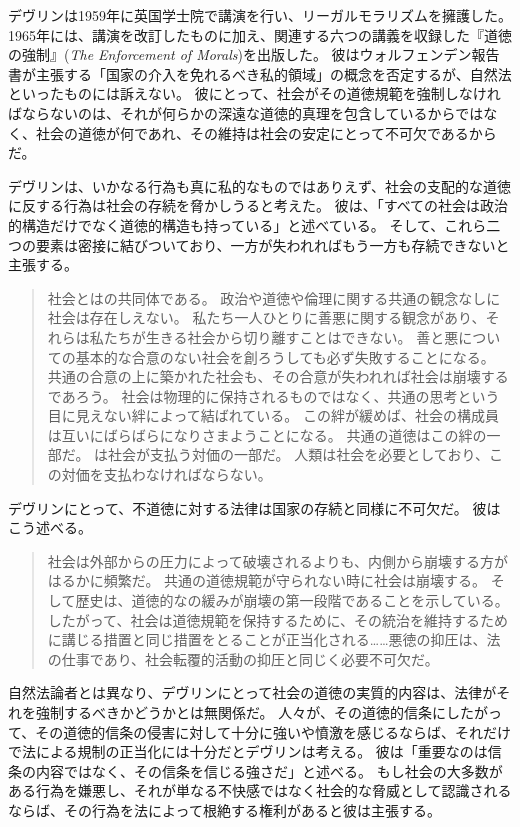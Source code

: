 \documentclass[paper=a4,book,openany]{jlreq} \usepackage{mystyle}
\begin{document}
デヴリンは1959年に英国学士院で講演を行い、リーガルモラリズムを擁護した。
1965年には、講演を改訂したものに加え、関連する六つの講義を収録した『道徳の強制』(\emph{The Enforcement of Morals})を出版した。
彼はウォルフェンデン報告書が主張する「国家の介入を免れるべき私的領域」の概念を否定するが、自然法といったものには訴えない。
彼にとって、社会がその道徳規範を強制しなければならないのは、それが何らかの深遠な道徳的真理を包含しているからではなく、社会の道徳が何であれ、その維持は社会の安定にとって不可欠であるからだ。

デヴリンは、いかなる行為も真に私的なものではありえず、社会の支配的な道徳に反する行為は社会の存続を脅かしうると考えた。
彼は、「すべての社会は政治的構造だけでなく道徳的構造も持っている」と述べている\citep[p.9]{devlin65:_enfor_moral}。
そして、これら二つの要素は密接に結びついており、一方が失われればもう一方も存続できないと主張する。

\begin{quote}
社会とはの共同体である。
政治や道徳や倫理に関する共通の観念なしに社会は存在しえない。
私たち一人ひとりに善悪に関する観念があり、それらは私たちが生きる社会から切り離すことはできない。
善と悪についての基本的な合意のない社会を創ろうしても必ず失敗することになる。
共通の合意の上に築かれた社会も、その合意が失われれば社会は崩壊するであろう。
社会は物理的に保持されるものではなく、共通の思考という目に見えない絆によって結ばれている。
この絆が緩めば、社会の構成員は互いにばらばらになりさまようことになる。
共通の道徳はこの絆の一部だ。
は社会が支払う対価の一部だ。
人類は社会を必要としており、この対価を支払わなければならない。
\citep[p.10]{devlin65:_enfor_moral}
\end{quote}

デヴリンにとって、不道徳に対する法律は国家の存続と同様に不可欠だ。
彼はこう述べる。

\begin{quote}
社会は外部からの圧力によって破壊されるよりも、内側から崩壊する方がはるかに頻繁だ。
共通の道徳規範が守られない時に社会は崩壊する。
そして歴史は、道徳的なの緩みが崩壊の第一段階であることを示している。
したがって、社会は道徳規範を保持するために、その統治を維持するために講じる措置と同じ措置をとることが正当化される……悪徳の抑圧は、法の仕事であり、社会転覆的活動の抑圧と同じく必要不可欠だ。
\citep[p.36]{devlin65:_enfor_moral}
\end{quote}

自然法論者とは異なり、デヴリンにとって社会の道徳の実質的内容は、法律がそれを強制するべきかどうかとは無関係だ。
人々が、その道徳的信条にしたがって、その道徳的信条の侵害に対して十分に強いや憤激を感じるならば、それだけで法による規制の正当化には十分だとデヴリンは考える。
彼は「重要なのは信条の内容ではなく、その信条を信じる強さだ」と述べる。
もし社会の大多数がある行為を嫌悪し、それが単なる不快感ではなく社会的な脅威として認識されるならば、その行為を法によって根絶する権利があると彼は主張する。
\end{document}
